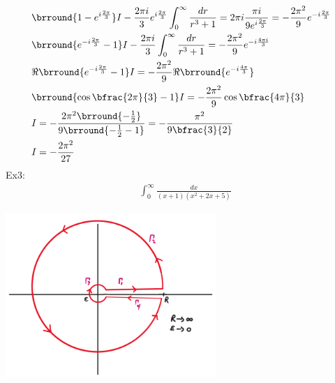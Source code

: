 \begin{align*}
    &\brround{1-e^{i\frac{2\pi}{3}}}I-\frac{2\pi i}{3}e^{i\frac{2\pi}{3}}\int_0^\infty\frac{dr}{r^3+1}=2\pi i\frac{\pi i}{9e^{i\frac{2\pi}{3}}}=-\frac{2\pi^2}{9}e^{-i\frac{2\pi}{3}}\\
    &\brround{e^{-i\frac{2\pi}{3}}-1}I-\frac{2\pi i}{3}\int_0^\infty\frac{dr}{r^3+1}=-\frac{2\pi^2}{9}e^{-i\frac{4\pi i}{3}}\\
    &\Re\brround{e^{-i\frac{2\pi}{3}}-1}I=-\frac{2\pi^2}{9}\Re\brround{e^{-i\frac{4\pi}{3}}}\\
    &\brround{\cos\bfrac{2\pi}{3}-1}I=-\frac{2\pi^2}{9}\cos\bfrac{4\pi}{3}\\
    &I=-\frac{2\pi^2\brround{-\frac{1}{2}}}{9\brround{-\frac{1}{2}-1}}=-\frac{\pi^2}{9\bfrac{3}{2}}\\
    &I=-\frac{2\pi^2}{27}
\end{align*}
Ex3:
\begin{align*}
    &\int_0^\infty\frac{dx}{(x+1)(x^2+2x+5)}
\end{align*}
\centerline{\includegraphics[width=0.6\textwidth]{Images/ComplexAnalysisPictures/KeyHole.png}}
